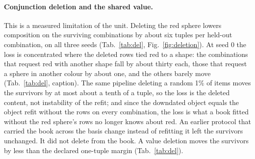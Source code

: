 \documentclass{article} %
\begin{document}
\paragraph{Conjunction deletion and the shared value.} This is a
measured limitation of the unit. Deleting the red sphere lowers composition on the surviving combinations
by about six tuples per held-out combination, on all three seeds (Tab.~\ref{tab:del}, Fig.~\ref{fig:deletion}). At seed 0 the loss is concentrated where %
the deleted rows tied red to a shape: the combinations that request red with another shape fall by %
about thirty each, those that request a sphere in another colour by about one, and the others barely move %
(Tab.~\ref{tab:del}, caption). The same pipeline deleting a random 1\% of items moves the survivors by at most about a tenth of a tuple, %
so the loss is the deleted content, not instability of the refit; and since the %
downdated object equals the object refit without the rows on every combination, the loss is what a book
fitted without the red sphere's rows no longer knows about red. An earlier protocol that carried the
book across the basis change instead of refitting it left the survivors unchanged. It did
not delete from the book. A value deletion moves the survivors %
by less than the declared one-tuple margin (Tab.~\ref{tab:del}). %
\end{document}
